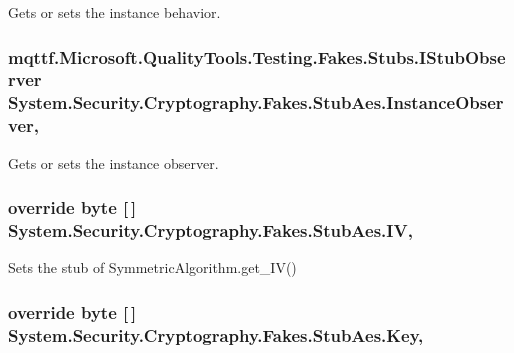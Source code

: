 Gets or sets the instance behavior.

\hypertarget{class_system_1_1_security_1_1_cryptography_1_1_fakes_1_1_stub_aes_a26b10d541c4963b5e0d13d0e45307592}{
\subsubsection[{Instance\-Observer}]{\setlength{\rightskip}{0pt plus 5cm}mqttf.\-Microsoft.\-Quality\-Tools.\-Testing.\-Fakes.\-Stubs.\-I\-Stub\-Observer System.\-Security.\-Cryptography.\-Fakes.\-Stub\-Aes.\-Instance\-Observer\hspace{0.3cm}{\ttfamily [get]}, {\ttfamily [set]}}}\label{class_system_1_1_security_1_1_cryptography_1_1_fakes_1_1_stub_aes_a26b10d541c4963b5e0d13d0e45307592}


Gets or sets the instance observer.

\hypertarget{class_system_1_1_security_1_1_cryptography_1_1_fakes_1_1_stub_aes_a7c7de573ea594a263767c18db2fbb90f}{
\subsubsection[{I\-V}]{\setlength{\rightskip}{0pt plus 5cm}override byte \mbox{[}$\,$\mbox{]} System.\-Security.\-Cryptography.\-Fakes.\-Stub\-Aes.\-I\-V\hspace{0.3cm}{\ttfamily [get]}, {\ttfamily [set]}}}\label{class_system_1_1_security_1_1_cryptography_1_1_fakes_1_1_stub_aes_a7c7de573ea594a263767c18db2fbb90f}


Sets the stub of Symmetric\-Algorithm.\-get\-\_\-\-I\-V()

\hypertarget{class_system_1_1_security_1_1_cryptography_1_1_fakes_1_1_stub_aes_a43ec6f63fb564f3a457371ad89427b70}{
\subsubsection[{Key}]{\setlength{\rightskip}{0pt plus 5cm}override byte \mbox{[}$\,$\mbox{]} System.\-Security.\-Cryptography.\-Fakes.\-Stub\-Aes.\-Key\hspace{0.3cm}{\ttfamily [get]}, {\ttfamily [set]}}}\label{class_system_1_1_security_1_1_cryptography_1_1_fakes_1_1_stub_aes_a43ec6f63fb564f3a457371ad89427b70}


